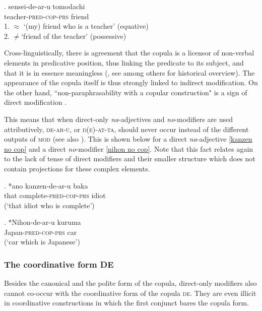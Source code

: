 \exg. sensei-de-ar-u tomodachi\\
teacher-\textsc{pred-cop-prs} friend\\
1. $\approx$ `(my) friend who is a teacher' (equative)\\
2. $\neq$`friend of the teacher' (possessive)

Cross-linguistically, there is agreement that the copula is a licensor of non-verbal elements in predicative position, thus linking the predicate to its subject, and that it is in essence meaningless (\citealt[1–6]{arche:2019:main}, see \citealt{moro:1997:raising, moro:2000:dynamic, bowers:2002:pred} among others for historical overview). The appearance of the copula itself is thus strongly linked to indirect modification. On the other hand, ``non-paraphrasability with a copular construction" is a sign of direct modification \citep[291–292]{alex:2007:nounphrase}.

This means that when direct-only \textit{na}-adjectives and \textit{no}-modifiers are used attributively, \textsc{de-ar-u}, or \textsc{d(e)-at-ta}, should never occur instead of the different outputs of \textsc{mod} (see also \citealt{ayano:2010:revisiting}). This is shown below for a direct \textit{na}-adjective \ref{kanzen no cop} and a direct \textit{no}-modifier \ref{nihon no cop}. Note that this fact relates again to the lack of tense of direct modifiers and their smaller structure which does not contain projections for these complex elements.

\exg. *ano kanzen-de-ar-u baka\\
that complete-\textsc{pred-cop-prs} idiot\\
(`that idiot who is complete’) \null \hfill \citep[108]{ayano:2010:revisiting} \label{kanzen no cop}

\exg. *Nihon-de-ar-u kuruma\\
Japan-\textsc{pred-cop-prs} car\\
(`car which is Japanese’) \label{nihon no cop}

\subsubsection {The coordinative form DE} \label{coordination copula}

Besides the canonical and the polite form of the copula, direct-only modifiers also cannot co-occur with the coordinative form of the copula \textsc{de}. They are even illicit in coordinative constructions in which the first conjunct bares the copula form.  

